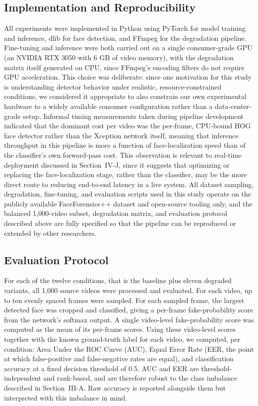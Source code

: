 \documentclass[conference]{IEEEtran}
\begin{document}
\subsection{Implementation and Reproducibility}
All experiments were implemented in Python using PyTorch for model training and inference, dlib for face detection, and FFmpeg for the degradation pipeline. Fine-tuning and inference were both carried out on a single consumer-grade GPU (an NVIDIA RTX 3050 with 6 GB of video memory), with the degradation matrix itself generated on CPU, since FFmpeg's encoding filters do not require GPU acceleration. This choice was deliberate: since one motivation for this study is understanding detector behavior under realistic, resource-constrained conditions, we considered it appropriate to also constrain our own experimental hardware to a widely available consumer configuration rather than a data-center-grade setup. Informal timing measurements taken during pipeline development indicated that the dominant cost per video was the per-frame, CPU-bound HOG face detector rather than the Xception network itself, meaning that inference throughput in this pipeline is more a function of face-localization speed than of the classifier's own forward-pass cost. This observation is relevant to real-time deployment discussed in Section~IV-J, since it suggests that optimizing or replacing the face-localization stage, rather than the classifier, may be the more direct route to reducing end-to-end latency in a live system. All dataset sampling, degradation, fine-tuning, and evaluation scripts used in this study operate on the publicly available FaceForensics++ dataset and open-source tooling only, and the balanced 1,000-video subset, degradation matrix, and evaluation protocol described above are fully specified so that the pipeline can be reproduced or extended by other researchers.

\subsection{Evaluation Protocol}
For each of the twelve conditions, that is the baseline plus eleven degraded variants, all 1,000 source videos were processed and evaluated. For each video, up to ten evenly spaced frames were sampled. For each sampled frame, the largest detected face was cropped and classified, giving a per-frame fake-probability score from the network's softmax output. A single video-level fake-probability score was computed as the mean of its per-frame scores. Using these video-level scores together with the known ground-truth label for each video, we computed, per condition: Area Under the ROC Curve (AUC), Equal Error Rate (EER, the point at which false-positive and false-negative rates are equal), and classification accuracy at a fixed decision threshold of 0.5. AUC and EER are threshold-independent and rank-based, and are therefore robust to the class imbalance described in Section~III-A. Raw accuracy is reported alongside them but interpreted with this imbalance in mind.
\end{document}
